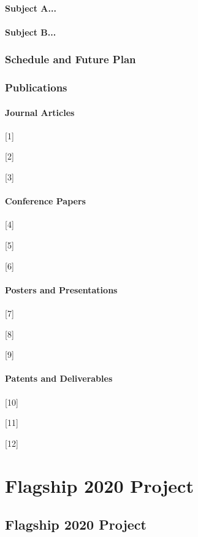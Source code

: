 \documentclass{book}
\begin{document}
\subsection{Subject A...}

\subsection{Subject B...}

\section{Schedule and Future Plan}

\section{Publications}

\subsection{Journal Articles}

[1] 

[2]

[3]

\subsection{Conference Papers}

[4]

[5]

[6]

\subsection{Posters and Presentations}

[7]

[8]

[9]

\subsection{Patents and Deliverables}

[10]

[11]

[12]


\part{Flagship 2020 Project}


\chapter{Flagship 2020 Project}
\end{document}
